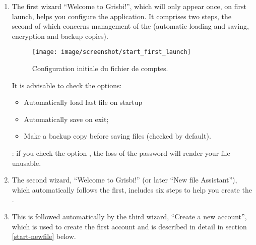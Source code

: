 \begin{enumerate}
	\item The first wizard \enquote{Welcome to Grisbi!}, which will only appear once, on first launch, helps you configure the application. It comprises two steps, the second of which concerns management of the  (automatic loading and saving, encryption and backup copies).

\begin{figure}[htbp]
	\begin{center}
		\texttt{[image: image/screenshot/start\_first\_launch]}
	\end{center}
	\caption{Configuration initiale du fichier de comptes.}
	\label{start_first_launch}
\end{figure}

It is advisable to check the options:

	\begin{itemize}
		\item Automatically load last file on startup%
		\item Automatically save on exit;%
		\item Make a backup copy before saving files (checked by default).%
	\end{itemize}

\textcolor{red}{}: if you check the option , the loss of the password will render your file unusable.%

	\item The second wizard, \enquote{Welcome to Grisbi!} (or later \enquote{New file Assistant}), which automatically follows the first, includes six steps to help you create the .%
	\item This is followed automatically by the third wizard, \enquote{Create a new account}, which is used to create the first account and is described in detail in section \ref{start-newfile} below.%
\end{enumerate}

